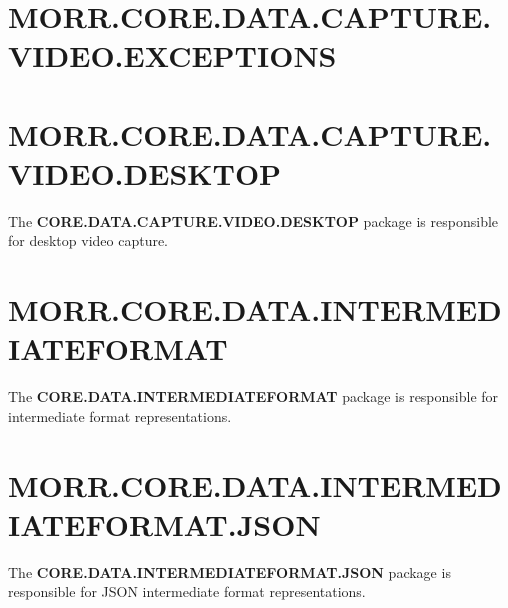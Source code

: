 \begin{packpack}
\end{packpack}

\section*{MORR.CORE.DATA.CAPTURE.VIDEO.EXCEPTIONS}

\begin{packclass}
\end{packclass}

\section*{MORR.CORE.DATA.CAPTURE.VIDEO.DESKTOP}

The \textbf{CORE.DATA.CAPTURE.VIDEO.DESKTOP} package is responsible for desktop video capture.

\begin{packclass}
\end{packclass}

\section*{MORR.CORE.DATA.INTERMEDIATEFORMAT}

The \textbf{CORE.DATA.INTERMEDIATEFORMAT} package is responsible for intermediate format representations.

\begin{packclass}
\end{packclass}

\begin{packpack}
\end{packpack}

\section*{MORR.CORE.DATA.INTERMEDIATEFORMAT.JSON}

The \textbf{CORE.DATA.INTERMEDIATEFORMAT.JSON} package is responsible for JSON intermediate format representations.

\begin{packclass}
\end{packclass}

